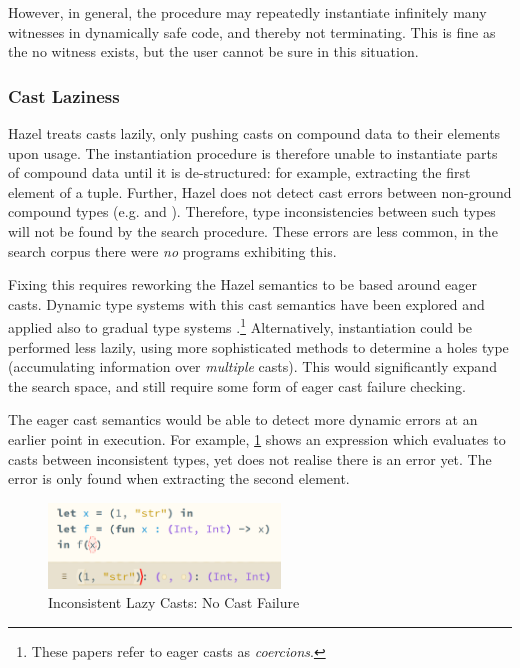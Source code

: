 However, in general, the procedure may repeatedly instantiate infinitely many witnesses in dynamically safe code, and thereby not terminating. This is fine as the no witness exists, but the user cannot be sure in this situation.

\subsubsection{Cast Laziness}\label{sec:EvalCastLaziness}
Hazel treats casts lazily, only pushing casts on compound data to their elements upon usage. The instantiation procedure is therefore unable to instantiate parts of compound data until it is de-structured: for example, extracting the first element of a tuple. Further, Hazel does not detect cast errors between non-ground compound types (e.g. \code{[Int]} and \code{[String]}). Therefore, type inconsistencies between such types will not be found by the search procedure. These errors are less common, in the search corpus there were \textit{no} programs exhibiting this.

Fixing this requires reworking the Hazel semantics to be based around eager casts. Dynamic type systems with this cast semantics have been explored \cite{EagerCasts} and applied also to gradual type systems \cite{GradualEagerCasts}.\footnote{These papers refer to eager casts as \textit{coercions}.} Alternatively, instantiation could be performed less lazily, using more sophisticated methods to determine a holes type (accumulating information over \textit{multiple} casts). This would significantly expand the search space, and still require some form of eager cast failure checking.

The eager cast semantics would be able to detect more dynamic errors at an earlier point in execution. For example, \cref{fig:LazyCastError} shows an expression which evaluates to casts between inconsistent types, yet does not realise there is an error yet. The error is only found when extracting the second element.
\begin{figure}[h]
\centering
\includegraphics[width=0.55\textwidth]{Media/Figures/cast_laziness_no_error}
\caption{Inconsistent Lazy Casts: No Cast Failure}
\label{fig:LazyCastError}
\end{figure}

